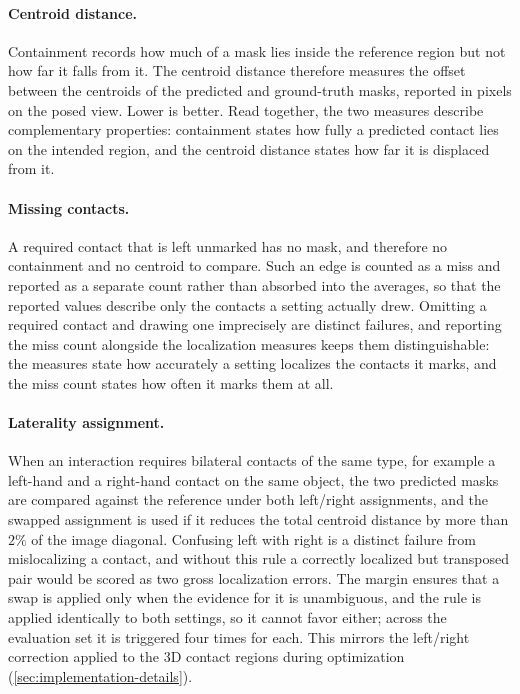 \paragraph{Centroid distance.} Containment records how much of a mask lies inside the reference region but not how far it falls from it. The centroid distance therefore measures the offset between the centroids of the predicted and ground-truth masks, reported in pixels on the posed view. Lower is better. Read together, the two measures describe complementary properties: containment states how fully a predicted contact lies on the intended region, and the centroid distance states how far it is displaced from it.

\paragraph{Missing contacts.} A required contact that is left unmarked has no mask, and therefore no containment and no centroid to compare. Such an edge is counted as a miss and reported as a separate count rather than absorbed into the averages, so that the reported values describe only the contacts a setting actually drew. Omitting a required contact and drawing one imprecisely are distinct failures, and reporting the miss count alongside the localization measures keeps them distinguishable: the measures state how accurately a setting localizes the contacts it marks, and the miss count states how often it marks them at all.

\paragraph{Laterality assignment.} When an interaction requires bilateral contacts of the same type, for example a left-hand and a right-hand contact on the same object, the two predicted masks are compared against the reference under both left/right assignments, and the swapped assignment is used if it reduces the total centroid distance by more than $2\%$ of the image diagonal. Confusing left with right is a distinct failure from mislocalizing a contact, and without this rule a correctly localized but transposed pair would be scored as two gross localization errors. The margin ensures that a swap is applied only when the evidence for it is unambiguous, and the rule is applied identically to both settings, so it cannot favor either; across the evaluation set it is triggered four times for each. This mirrors the left/right correction applied to the 3D contact regions during optimization (\cref{sec:implementation-details}).

